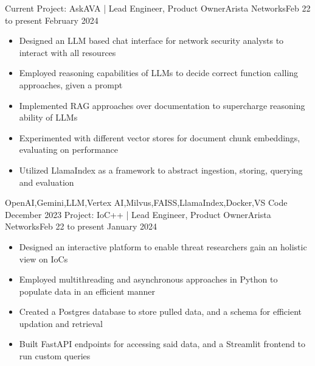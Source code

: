 %
%
%

\begin{experiences}
  \experience
    {Current}       {Project: AskAVA | Lead Engineer, Product Owner}{Arista Networks}{Feb 22 to present}
    {February 2024} {
                      \begin{itemize}
                        \item Designed an LLM based chat interface for network security analysts to interact with all resources
                        \item Employed reasoning capabilities of LLMs to decide correct function calling approaches, given a prompt
                        \item Implemented RAG approaches over documentation to supercharge reasoning ability of LLMs
                        \item Experimented with different vector stores for document chunk embeddings, evaluating on performance
                        \item Utilized LlamaIndex as a framework to abstract ingestion, storing, querying and evaluation
                      \end{itemize}
                    }
                    {OpenAI,Gemini,LLM,Vertex AI,Milvus,FAISS,LlamaIndex,Docker,VS Code}
  \emptySeparator
  \experience
    {December 2023} {Project: IoC++ | Lead Engineer, Product Owner}{Arista Networks}{Feb 22 to present}
    {January 2024}  {
                      \begin{itemize}
                        \item Designed an interactive platform to enable threat researchers gain an holistic view on IoCs
                        \item Employed multithreading and asynchronous approaches in Python to populate data in an efficient manner
                        \item Created a Postgres database to store pulled data, and a schema for efficient updation and retrieval
                        \item Built FastAPI endpoints for accessing said data, and a Streamlit frontend to run custom queries

\end{itemize}}
\end{experiences}
